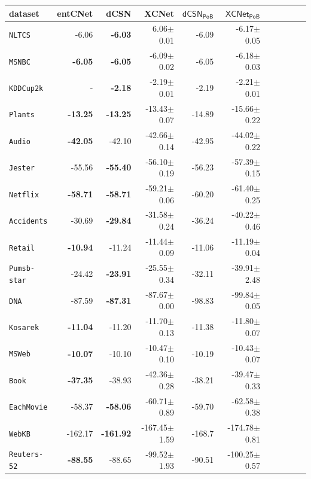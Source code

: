 \documentclass[final]{beamer}
\begin{document}
\begin{frame}{}
\begin{textblock}{17.5}
\begin{minipage}{0.7\linewidth}
    \begin{table}[t]
  \tiny
  \centering
  \setlength{\tabcolsep}{3pt}  
  \begin{tabular}{l rrrrrrrrrr}
    dataset & \tiny\textsf{entCNet} & \tiny\textsf{dCSN} & \tiny\textsf{XCNet} & \tiny$\mathsf{dCSN_{PoB}}$ & \tiny$\mathsf{XCNet_{PoB}}$\\
    \midrule
    \texttt{NLTCS}        &-6.06 &\textbf{-6.03}&6.06$\pm$0.01&-6.09&-6.17$\pm$0.05\\
    \texttt{MSNBC}        &\textbf{-6.05}&\textbf{-6.05}&-6.09$\pm$0.02&-6.05&-6.18$\pm$0.03\\
    \texttt{KDDCup2k}     & - &\textbf{-2.18}&-2.19$\pm$0.01&-2.19&-2.21$\pm$0.01\\
    \texttt{Plants}       &\textbf{-13.25}&\textbf{-13.25}&-13.43$\pm$0.07&-14.89&-15.66$\pm$0.22\\
    \texttt{Audio}        &\textbf{-42.05}&-42.10&-42.66$\pm$0.14&-42.95&-44.02$\pm$0.22\\
    \texttt{Jester}       &-55.56&\textbf{-55.40}&-56.10$\pm$0.19&-56.23&-57.39$\pm$0.15\\
    \texttt{Netflix}      &\textbf{-58.71}&\textbf{-58.71}&-59.21$\pm$0.06&-60.20&-61.40$\pm$0.25\\
    \texttt{Accidents}    &-30.69&\textbf{-29.84}& -31.58$\pm$0.24 &-36.24&-40.22$\pm$0.46\\
    \texttt{Retail}       &\textbf{-10.94}&-11.24&-11.44$\pm$0.09&-11.06&-11.19$\pm$0.04\\
    \texttt{Pumsb-star}   &-24.42&\textbf{-23.91}&-25.55$\pm$0.34&-32.11&-39.91$\pm$2.48\\
    \texttt{DNA}          &-87.59&\textbf{-87.31}&-87.67$\pm$0.00&-98.83&-99.84$\pm$0.05\\
    \texttt{Kosarek}      &\textbf{-11.04}&-11.20&-11.70$\pm$0.13&-11.38&-11.80$\pm$0.07\\
    \texttt{MSWeb}        &\textbf{-10.07}&-10.10&-10.47$\pm$0.10&-10.19&-10.43$\pm$0.07\\
    \texttt{Book}         &\textbf{-37.35}&-38.93&-42.36$\pm$0.28&-38.21&-39.47$\pm$0.33\\
    \texttt{EachMovie}    &-58.37&\textbf{-58.06}&-60.71$\pm$0.89&-59.70&-62.58$\pm$0.38\\
    \texttt{WebKB}        &-162.17&\textbf{-161.92}&-167.45$\pm$1.59&-168.7&-174.78$\pm$0.81\\
    \texttt{Reuters-52}   &\textbf{-88.55}&-88.65&-99.52$\pm$1.93&-90.51&-100.25$\pm$0.57\\

\end{tabular}
\end{table}
\end{minipage}
\end{textblock}
\end{frame}
\end{document}
